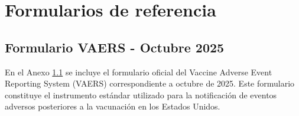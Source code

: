 

	



\chapter{Formularios de referencia}

\section{Formulario VAERS - Octubre 2025}
\label{app:vaers-form-oct2025}

En el Anexo \ref{app:vaers-form-oct2025} se incluye el formulario oficial del Vaccine Adverse Event Reporting System (VAERS) correspondiente a octubre de 2025. Este formulario constituye el instrumento estándar utilizado para la notificación de eventos adversos posteriores a la vacunación en los Estados Unidos.

